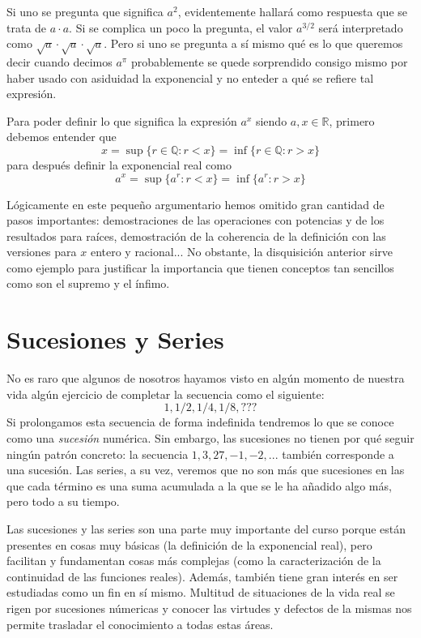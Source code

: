\documentclass[10pt,a4paper,openright]{book}
\theoremstyle{break}
\begin{document}
Si uno se pregunta que significa $a^2$, evidentemente hallará como respuesta que se trata de $a\cdot a$. Si se complica un poco la pregunta, el valor $a^{3/2}$ será interpretado como $\sqrt{a} \cdot \sqrt{a} \cdot \sqrt{a}$. Pero si uno se pregunta a sí mismo qué es lo que queremos decir cuando decimos $a^\pi$ probablemente se quede sorprendido consigo mismo por haber usado con asiduidad la exponencial y no enteder a qué se refiere tal expresión.

Para poder definir lo que significa la expresión $a^x$ siendo $a,x\in \mathbb R$, primero debemos entender que
\[
x=\sup\{r\in \mathbb Q: r<x\}=\inf\{r\in \mathbb Q: r>x\}
\]
para después definir la exponencial real como 
\[
a^x=\sup\{a^r: r<x\}=\inf\{a^r: r>x\}
\]

Lógicamente en este pequeño argumentario hemos omitido gran cantidad de pasos importantes: demostraciones de las operaciones con potencias y de los resultados para raíces, demostración de la coherencia de la definición con las versiones para $x$ entero y racional... No obstante, la disquisición anterior sirve como ejemplo para justificar la importancia que tienen conceptos tan sencillos como son el supremo y el ínfimo.

\chapter{Sucesiones y Series}
\label{chap: sucesiones y series}
No es raro que algunos de nosotros hayamos visto en algún momento de nuestra vida algún ejercicio de completar la secuencia como el siguiente:
\[
1, 1/2, 1/4, 1/8, ???
\]
Si prolongamos esta secuencia de forma indefinida tendremos lo que se conoce como una \textit{sucesión} numérica. Sin embargo, las sucesiones no tienen por qué seguir ningún patrón concreto: la secuencia $1, 3, 27, -1, -2, ...$ también corresponde a una sucesión. Las series, a su vez, veremos que no son más que sucesiones en las que cada término es una suma acumulada a la que se le ha añadido algo más, pero todo a su tiempo.

Las sucesiones y las series son una parte muy importante del curso porque están presentes en cosas muy básicas (la definición de la exponencial real), pero facilitan y fundamentan cosas más complejas (como la caracterización de la continuidad de las funciones reales). Además, también tiene gran interés en ser estudiadas como un fin en sí mismo. Multitud de situaciones de la vida real se rigen por sucesiones númericas y conocer las virtudes y defectos de la mismas nos permite trasladar el conocimiento a todas estas áreas.
\end{document}
